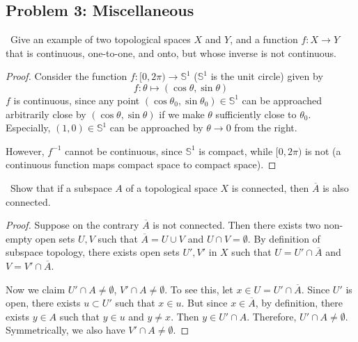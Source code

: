 \documentclass[12pt, a4paper]{amsart}
\newcommand{\turnin}{\faPencilSquareO}
\begin{document}
\subsection*{Problem 3: Miscellaneous}
\begin{compactenum}[(a)]
  \setlength{\itemsep}{0.5em}

\item \turnin\ Give an example of two topological spaces $X$ and $Y$, and a function $f\colon X \to Y$ that is continuous, one-to-one, and onto, but whose inverse is not continuous.

\begin{proof}
Consider the function $f: [0, 2\pi) \to \mathbb{S}^1$ ($\mathbb{S}^1$ is the unit circle) given by $$ f: \theta \mapsto (\cos \theta, \sin \theta)$$
$f$ is continuous, since any point $(\cos \theta_0, \sin \theta_0)\in\mathbb{S}^1$ 
can be approached arbitrarily close by $(\cos \theta, \sin \theta)$ 
if we make $\theta$ sufficiently close to $\theta_0$. 
Especially, $(1,0)\in\mathbb{S}^1$ can be approached by $\theta\to 0$ from the right.

\noindent However, $f^{-1}$ cannot be continuous, since $\mathbb{S}^1$ is compact, 
while $[0,2\pi)$ is not (a continuous function maps compact space to compact space). 
\end{proof}


\item \turnin\ Show that if a subspace $A$ of a topological space $X$ is connected, then $\overline{A}$ is also connected.

\begin{proof}
Suppose on the contrary $\overline{A}$ is not connected. Then there exists two non-empty
open sets $U,V$ such that $\overline{A} = U\cup V$ and $U \cap V = \emptyset$.
By definition of subspace topology, there exists open sets $U',V'$ in $X$ such that 
$U = U'\cap\overline{A}$ and $V = V'\cap\overline{A}$. 

\noindent Now we claim $U' \cap A \neq \emptyset$, $V' \cap A \neq \emptyset$.
To see this, let $x \in U = U'\cap\overline{A}$.
Since $U'$ is open, there exists $u\subset U'$ such that $x\in u$.
But since $x\in\overline{A}$, by definition, there exists $y\in A$ such that $y\in u$
and $y\neq x$. Then $y \in U' \cap A$. Therefore, $U' \cap A \neq \emptyset$.
Symmetrically, we also have $V' \cap A \neq \emptyset$.


\end{proof}
\end{compactenum}
\end{document}
